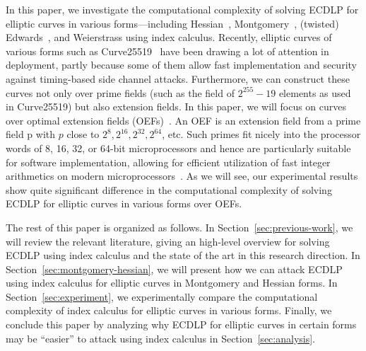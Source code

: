 In this paper, we investigate the computational complexity of solving
ECDLP for elliptic curves in various forms---including
Hessian~\cite{DBLP:conf/ches/Smart01},
Montgomery~\cite{1987-montgomery}, (twisted)
Edwards~\cite{DBLP:journals/iacr/BernsteinL07,DBLP:journals/iacr/BernsteinBJLP08},
and Weierstrass using index calculus.
%
Recently, elliptic curves of various forms such as
Curve25519~\cite{DBLP:conf/pkc/Bernstein06} have been drawing a lot of
attention in deployment, partly because some of them allow fast
implementation and security against timing-based side channel attacks.
%
Furthermore, we can construct these curves not only over prime fields
(such as the field of $2^{255} - 19$ elements as used in Curve25519)
but also extension fields.
%
In this paper, we will focus on curves over optimal extension fields
(OEFs)~\cite{DBLP:conf/crypto/BaileyP98}.
%
An OEF is an extension field from a prime field \F p with $p$ close to
$2^8, 2^{16}, 2^{32}, 2^{64}$, etc.
%
Such primes fit nicely into the processor words of 8, 16, 32, or
64-bit microprocessors and hence are particularly suitable for
software implementation, allowing for efficient utilization of fast
integer arithmetics on modern
microprocessors~\cite{DBLP:conf/crypto/BaileyP98}.
%
As we will see, our experimental results show quite significant
difference in the computational complexity of solving ECDLP for
elliptic curves in various forms over OEFs.

The rest of this paper is organized as follows.
%
In Section~\ref{sec:previous-work}, we will review the relevant
literature, giving an high-level overview for solving ECDLP using
index calculus and the state of the art in this research direction.
%
In Section~\ref{sec:montgomery-hessian}, we will present how we can
attack ECDLP using index calculus for elliptic curves in Montgomery
and Hessian forms.
%
In Section~\ref{sec:experiment}, we experimentally compare the
computational complexity of index calculus for elliptic curves in
various forms.
%
Finally, we conclude this paper by analyzing why ECDLP for elliptic
curves in certain forms may be ``easier'' to attack using index
calculus in Section~\ref{sec:analysis}.
%

